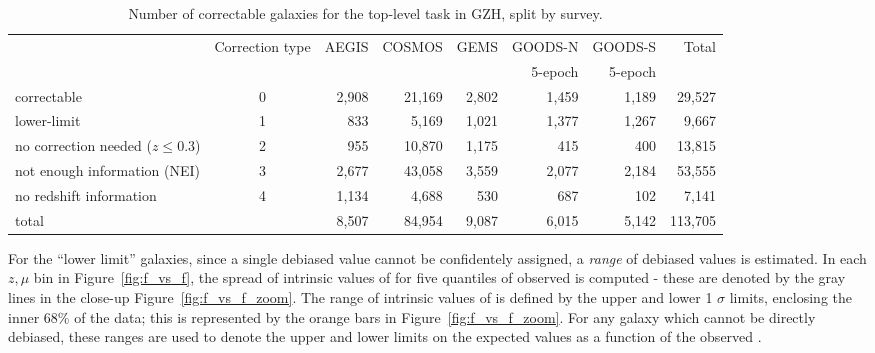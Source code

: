 \begin{table}
\caption{Number of correctable galaxies for the top-level task in GZH, split by \hst{} survey.}\label{tab:hubble_debiasable}
\begin{tabular}{lcrrrrr|r}
\hline\hline
                                   & Correction type & AEGIS   & COSMOS & GEMS  & GOODS-N & GOODS-S  &  Total  \\
                                   &                 &         &        &       & 5-epoch & 5-epoch  &         \\
\hline
correctable                        & 0               & 2,908   & 21,169 & 2,802 & 1,459   & 1,189    &  29,527 \\
lower-limit                        & 1               &   833   &  5,169 & 1,021 & 1,377   & 1,267    &   9,667 \\
no correction needed ($z \le 0.3$) & 2               &   955   & 10,870 & 1,175 &   415   &   400    &  13,815 \\ 
not enough information (NEI)       & 3               & 2,677   & 43,058 & 3,559 & 2,077   & 2,184    &  53,555 \\
no redshift information            & 4               & 1,134   &  4,688 &   530 &   687   &   102    &   7,141 \\
\hline
total                              &                 & 8,507   & 84,954 & 9,087 & 6,015   & 5,142    & 113,705 \\
\hline\hline
\end{tabular}
\end{table}




For the ``lower limit'' galaxies, since a single debiased \ffeatures{} value cannot be confidentely assigned, a \emph{range} of debiased values is estimated. In each $z,\mu$ bin in Figure~\ref{fig:f_vs_f}, the spread of intrinsic values of \ffeaturesrest{} for five quantiles of observed \ffeatures{} is computed - these are denoted by the gray lines in the close-up Figure~\ref{fig:f_vs_f_zoom}. The range of intrinsic values of \ffeatures{} is defined by the upper and lower 1 $\sigma$ limits, enclosing the inner 68\% of the data; this is represented by the orange bars in Figure~\ref{fig:f_vs_f_zoom}. For any galaxy which cannot be directly debiased, these ranges are used to denote the upper and lower limits on the expected values \ffeaturesrest{} as a function of the observed \ffeatures{}. 

